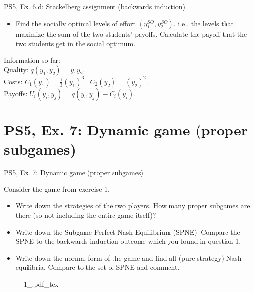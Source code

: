 \begin{frame}{PS5, Ex. 6.d: Stackelberg assignment (backwards induction)}
  \begin{itemize}
    \item[(d)] Find the socially optimal levels of effort $(y_1^{SO}, y_2^{SO})$, i.e., the levels that maximize the sum of the two students’ payoffs. Calculate the payoff that the two students get in the social optimum.
  \end{itemize}
  \begin{multicols}{2}
    \vfill\null \columnbreak
    Information so far:\\\medskip
    Quality: $q(y_1, y_2) = y_1y_2.$\\
    Costs: $C_1(y_1) = \frac{1}{3}(y_1)^3,\ \ C_2(y_2) = (y_2)^2.$\\
    Payoffs: $U_i(y_i,y_j) = q(y_i,y_j)-C_i(y_i).$
  \end{multicols}
\end{frame}



\section{PS5, Ex. 7: Dynamic game (proper subgames)}

\begin{frame}{PS5, Ex. 7: Dynamic game (proper subgames)}
  \begin{multicols}{2}
    Consider the game from exercise 1.
    \begin{itemize}
      \item[(a)] Write down the strategies of the two players. How many proper subgames are there (so not including the entire game itself)?
      \item[(b)] Write down the Subgame-Perfect Nash Equilibrium (SPNE). Compare the SPNE to the backwards-induction outcome which you found in question 1.
      \item[(c)] Write down the normal form of the game and find all (pure strategy) Nash equilibria. Compare to the set of SPNE and comment.
    \end{itemize}
    \vfill\null \columnbreak
    \begin{figure}[!h]
      \center
      \def\svgwidth{.8\columnwidth}
      {1_.pdf_tex}
    \end{figure}
    \vfill\null
  \end{multicols}
\end{frame}

